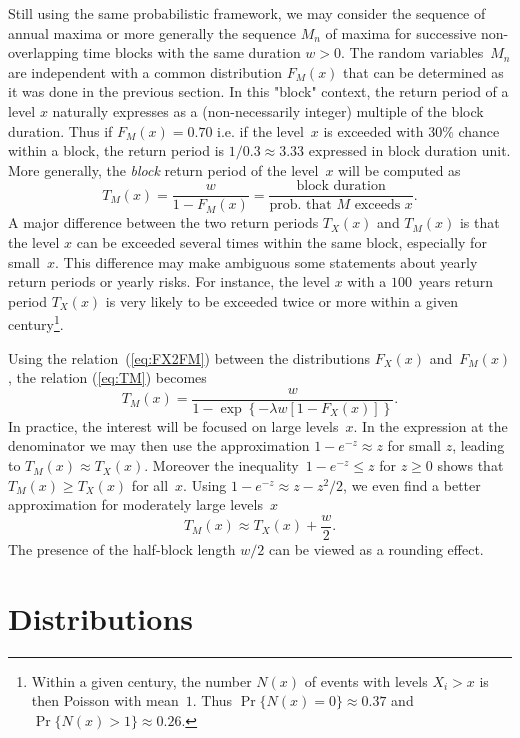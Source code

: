 \documentclass[a4paper]{report}
\begin{document}
Still using the same probabilistic framework, we may consider the
sequence of annual maxima or more generally the sequence $M_n$ of
maxima for successive non-overlapping time blocks with the same
duration $w>0$. The random variables~$M_n$ are independent with a
common distribution $F_M(x)$ that can be determined as it was done in
the previous section.  In this "block" context, the return period of a
level $x$ naturally expresses as a (non-necessarily integer) multiple
of the block duration. Thus if $F_M(x) = 0.70$ i.e. if the level~$x$
is exceeded with $30\%$ chance within a block, the return period is
$1/0.3 \approx 3.33$ expressed in block duration unit. More generally,
the \textit{block} return period of the level~$x$ will be computed as
\begin{equation}
  \label{eq:TM}
  T_M(x) = \frac{w}{1-F_M(x)} 
   = \frac{\textrm{block duration}}{\textrm{prob. that }M\textrm{ exceeds }x}.
\end{equation}
A major difference between the two return periods $T_X(x)$ and $T_M(x)$
is that the level $x$ can be exceeded 
several times within the same block, especially for small~$x$. This difference
may make ambiguous some statements about yearly return periods or yearly risks.
For instance, the level $x$ with a $100$~years return period $T_X(x)$ is very 
likely to be exceeded twice or more within a given century\footnote{Within a given century,
the number $N(x)$ of events with levels $X_i>x$ is then Poisson with mean~$1$. Thus
$\Pr\{N(x) = 0\} \approx 0.37$ and $\Pr\{N(x) > 1\} \approx 0.26$.}.

Using the relation~(\ref{eq:FX2FM}) between the distributions $F_X(x)$
and~$F_M(x)$, the relation (\ref{eq:TM}) becomes
\begin{equation}
   \label{eq:TAUM2}
    T_M(x) = \frac{w}{1-\exp\left\{-\lambda w \left[1-F_X(x)\right]\right\}}. 
\end{equation}
In practice, the interest will be focused on large levels~$x$.  In the
expression at the denominator we may then use the approximation
$1-e^{-z} \approx z$ for small $z$, leading to $T_M(x) \approx
T_X(x)$.  Moreover the inequality~$1-e^{-z} \leqslant z$ for $z
\geqslant 0$ shows that $T_M(x) \geqslant T_X(x) $ for all~$x$. Using
$1-e^{-z} \approx z -z^2/2$, we even find a better approximation for
moderately large levels~$x$
$$
    T_M(x) \approx T_X(x) + \frac{w}{2}.
$$
The presence of the half-block length $w/2$ can be viewed as a 
rounding effect.
\chapter{Distributions}
\end{document}
